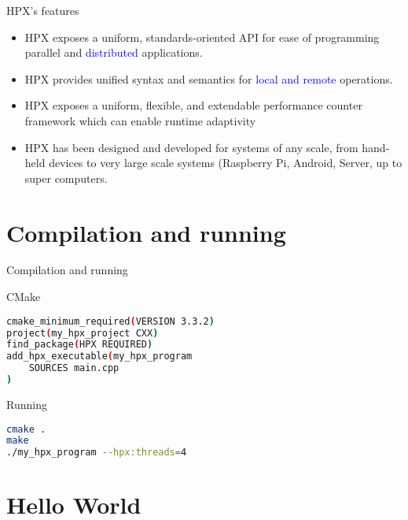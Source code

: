 \documentclass[12pt,t]{beamer}
\begin{document}
\begin{frame}{HPX's features}
\begin{itemize}
\item HPX exposes a uniform, standards-oriented API for ease of programming parallel and \textcolor{blue}{distributed} applications.
\item HPX provides unified syntax and semantics for \textcolor{blue}{local and remote} operations.
\item HPX exposes a uniform, flexible, and extendable performance counter framework which can enable runtime adaptivity
\item HPX has been designed and developed for systems of any scale, from hand-held devices to very large scale systems (Raspberry Pi, Android, Server, up to super computers.
\end{itemize}
\end{frame}


\section{Compilation and running}

\begin{frame}[fragile]{Compilation and running}

\begin{block}{CMake}
\begin{lstlisting}[language=bash]
cmake_minimum_required(VERSION 3.3.2)
project(my_hpx_project CXX)
find_package(HPX REQUIRED)
add_hpx_executable(my_hpx_program
    SOURCES main.cpp
)
\end{lstlisting}
\end{block}

\begin{block}{Running}
\begin{lstlisting}[language=bash]
cmake .
make
./my_hpx_program --hpx:threads=4
\end{lstlisting}
\end{block}
\end{frame}


\section{Hello World}
\end{document}
